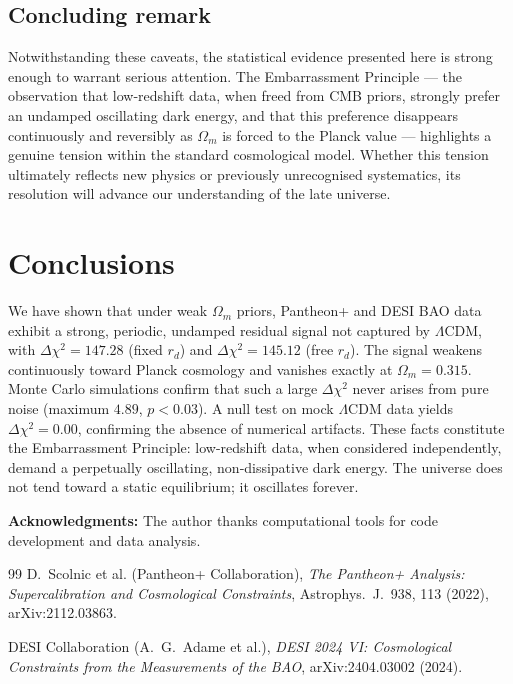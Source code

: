 \documentclass[10pt,a4paper,twocolumn]{article}
\begin{document}
\subsection{Concluding remark}
Notwithstanding these caveats, the statistical evidence presented here is strong enough to warrant serious attention. The Embarrassment Principle — the observation that low‑redshift data, when freed from CMB priors, strongly prefer an undamped oscillating dark energy, and that this preference disappears continuously and reversibly as $\Omega_m$ is forced to the Planck value — highlights a genuine tension within the standard cosmological model. Whether this tension ultimately reflects new physics or previously unrecognised systematics, its resolution will advance our understanding of the late universe.

\section{Conclusions}
We have shown that under weak $\Omega_m$ priors, Pantheon+ and DESI BAO data exhibit a strong, periodic, undamped residual signal not captured by $\Lambda$CDM, with $\Delta\chi^2=147.28$ (fixed $r_d$) and $\Delta\chi^2=145.12$ (free $r_d$). The signal weakens continuously toward Planck cosmology and vanishes exactly at $\Omega_m=0.315$. Monte Carlo simulations confirm that such a large $\Delta\chi^2$ never arises from pure noise (maximum $4.89$, $p<0.03$). A null test on mock $\Lambda$CDM data yields $\Delta\chi^2=0.00$, confirming the absence of numerical artifacts. These facts constitute the Embarrassment Principle: low-redshift data, when considered independently, demand a perpetually oscillating, non‑dissipative dark energy. The universe does not tend toward a static equilibrium; it oscillates forever.

\vspace{1em}
\textbf{Acknowledgments:} The author thanks computational tools for code development and data analysis.


\begin{thebibliography}{99}
D.~Scolnic et al. (Pantheon+ Collaboration),
\emph{The Pantheon+ Analysis: Supercalibration and Cosmological Constraints},
Astrophys.~J.~938, 113 (2022), arXiv:2112.03863.

DESI Collaboration (A.~G.~Adame et al.),
\emph{DESI 2024 VI: Cosmological Constraints from the Measurements of the BAO},
arXiv:2404.03002 (2024).
\end{thebibliography}
\end{document}
